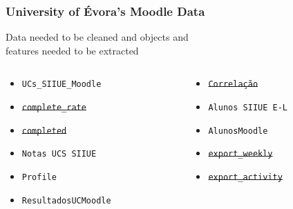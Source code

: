 \begin{frame}
\frametitle{University of Évora's Moodle Data}

\centering
Data needed to be cleaned and objects and\\features needed to be extracted

\vspace{1cm}

\begin{columns}[T] %
\begin{column}{.48\textwidth}

\begin{itemize}
    \item \texttt{UCs\_SIIUE\_Moodle}
    \item \sout{\texttt{\color{gray}complete\_rate}}
    \item \sout{\texttt{\color{gray}completed}}
    \item \texttt{Notas UCS SIIUE}
    \item \texttt{Profile}
    \item \texttt{ResultadosUCMoodle}
\end{itemize}
\end{column}%
\hfill%
\begin{column}{.48\textwidth}

\begin{itemize}
    \item \sout{\texttt{\color{gray}Correlação}}
    \item \texttt{Alunos SIIUE E-L}
    \item \texttt{AlunosMoodle}
    \item \sout{\texttt{\color{gray}export\_weekly}}
    \item \sout{\texttt{\color{gray}export\_activity}}
\end{itemize}
\end{column}%
\end{columns}
\end{frame}


